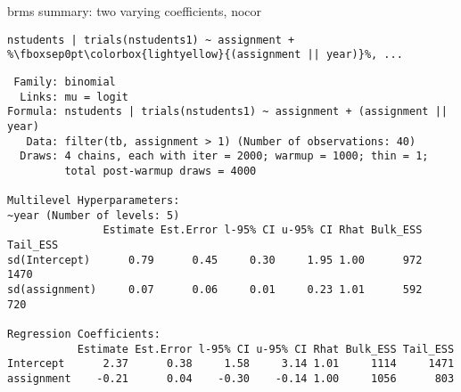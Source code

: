 \documentclass[finnish,english,t]{beamer}
\begin{document}
\begin{frame}[fragile]{brms summary: two varying coefficients, nocor}

  \vspace{-0.5\baselineskip}
\begin{verbatim}
nstudents | trials(nstudents1) ~ assignment + %\fboxsep0pt\colorbox{lightyellow}{(assignment || year)}%, ...
\end{verbatim}

\begin{verbatim}
 Family: binomial 
  Links: mu = logit 
Formula: nstudents | trials(nstudents1) ~ assignment + (assignment || year) 
   Data: filter(tb, assignment > 1) (Number of observations: 40) 
  Draws: 4 chains, each with iter = 2000; warmup = 1000; thin = 1;
         total post-warmup draws = 4000

Multilevel Hyperparameters:
~year (Number of levels: 5) 
               Estimate Est.Error l-95% CI u-95% CI Rhat Bulk_ESS Tail_ESS
sd(Intercept)      0.79      0.45     0.30     1.95 1.00      972     1470
sd(assignment)     0.07      0.06     0.01     0.23 1.01      592      720

Regression Coefficients:
           Estimate Est.Error l-95% CI u-95% CI Rhat Bulk_ESS Tail_ESS
Intercept      2.37      0.38     1.58     3.14 1.01     1114     1471
assignment    -0.21      0.04    -0.30    -0.14 1.00     1056      803
\end{verbatim}

\end{frame}
\end{document}
